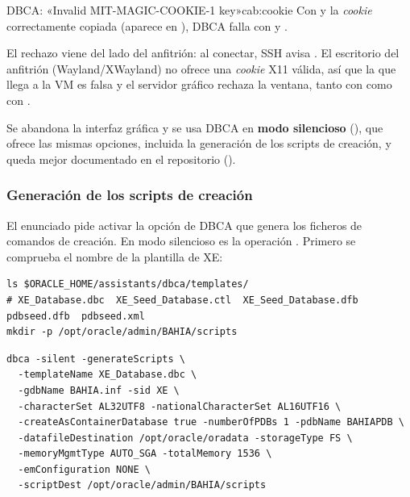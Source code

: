\begin{cabezazo}{DBCA: «Invalid MIT-MAGIC-COOKIE-1 key»}{cab:cookie}
\problema Con  y la \emph{cookie} correctamente
copiada (aparece en ), DBCA falla con
 y
.

\causa El rechazo viene del lado del anfitrión: al conectar, SSH avisa
. El escritorio del anfitrión (Wayland/XWayland) no ofrece una
\emph{cookie} X11 válida, así que la que llega a la VM es falsa y el servidor
gráfico rechaza la ventana, tanto con  como con .

\solucion Se abandona la interfaz gráfica y se usa DBCA en \textbf{modo
silencioso} (), que ofrece las mismas opciones, incluida la
generación de los scripts de creación, y queda mejor documentado en el
repositorio ().
\end{cabezazo}


\subsubsection{Generación de los scripts de creación}

El enunciado pide activar la opción de DBCA que genera los ficheros de comandos
de creación. En modo silencioso es la operación . Primero
se comprueba el nombre de la plantilla de XE:

\begin{lstlisting}[style=bash]
ls $ORACLE_HOME/assistants/dbca/templates/
# XE_Database.dbc  XE_Seed_Database.ctl  XE_Seed_Database.dfb  pdbseed.dfb  pdbseed.xml
mkdir -p /opt/oracle/admin/BAHIA/scripts
\end{lstlisting}

\begin{lstlisting}[style=bash]
dbca -silent -generateScripts \
  -templateName XE_Database.dbc \
  -gdbName BAHIA.inf -sid XE \
  -characterSet AL32UTF8 -nationalCharacterSet AL16UTF16 \
  -createAsContainerDatabase true -numberOfPDBs 1 -pdbName BAHIAPDB \
  -datafileDestination /opt/oracle/oradata -storageType FS \
  -memoryMgmtType AUTO_SGA -totalMemory 1536 \
  -emConfiguration NONE \
  -scriptDest /opt/oracle/admin/BAHIA/scripts
\end{lstlisting}

